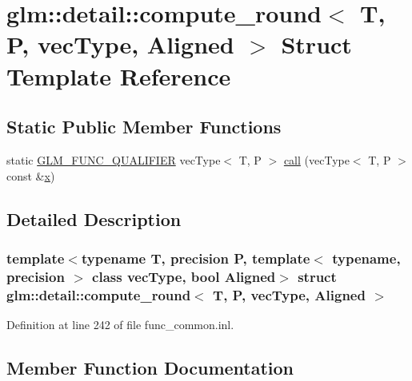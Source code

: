 \hypertarget{structglm_1_1detail_1_1compute__round}{}\section{glm\+::detail\+::compute\+\_\+round$<$ T, P, vec\+Type, Aligned $>$ Struct Template Reference}
\label{structglm_1_1detail_1_1compute__round}
\subsection*{Static Public Member Functions}
\begin{DoxyCompactItemize}
\item 
static \mbox{\hyperlink{setup_8hpp_a33fdea6f91c5f834105f7415e2a64407}{G\+L\+M\+\_\+\+F\+U\+N\+C\+\_\+\+Q\+U\+A\+L\+I\+F\+I\+ER}} vec\+Type$<$ T, P $>$ \mbox{\hyperlink{structglm_1_1detail_1_1compute__round_a42119067083f483e40f6449e9d3d87ef}{call}} (vec\+Type$<$ T, P $>$ const \&\mbox{\hyperlink{glad_8h_a92d0386e5c19fb81ea88c9f99644ab1d}{x}})
\end{DoxyCompactItemize}


\subsection{Detailed Description}
\subsubsection*{template$<$typename T, precision P, template$<$ typename, precision $>$ class vec\+Type, bool Aligned$>$\newline
struct glm\+::detail\+::compute\+\_\+round$<$ T, P, vec\+Type, Aligned $>$}



Definition at line 242 of file func\+\_\+common.\+inl.



\subsection{Member Function Documentation}
\mbox{\label{structglm_1_1detail_1_1compute__round_a42119067083f483e40f6449e9d3d87ef}} 
